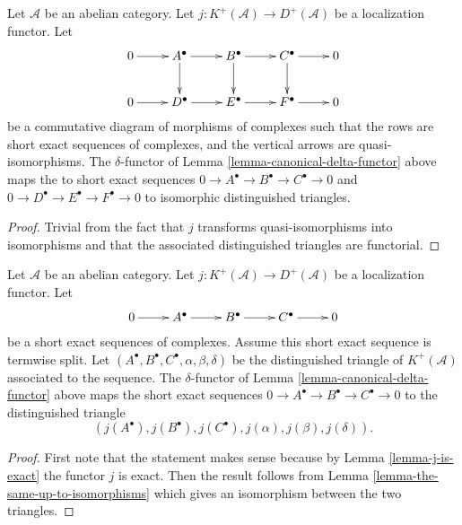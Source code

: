 \begin{lemma}
\label{lemma-compare-triangles-ses}
Let $\mathcal{A}$ be an abelian category.
Let $j : K^{+}(\mathcal{A}) \to D^{+}(\mathcal{A})$ be
a localization functor.
Let
$$
\xymatrix{
0 \ar[r] &
A^\bullet \ar[r] \ar[d] &
B^\bullet \ar[r] \ar[d] &
C^\bullet \ar[r] \ar[d] &
0 \\
0 \ar[r] &
D^\bullet \ar[r] &
E^\bullet \ar[r] &
F^\bullet \ar[r] &
0
}
$$
be a commutative diagram of morphisms of complexes
such that the rows are short exact sequences of complexes, and
the vertical arrows are quasi-isomorphisms.
The $\delta$-functor of Lemma \ref{lemma-canonical-delta-functor} above
maps the to short exact sequences
$0 \to A^\bullet \to B^\bullet \to C^\bullet \to 0$
and
$0 \to D^\bullet \to E^\bullet \to F^\bullet \to 0$
to isomorphic distinguished triangles.
\end{lemma}

\begin{proof}
Trivial from the fact that $j$ transforms quasi-isomorphisms
into isomorphisms and that the associated distinguished
triangles are functorial.
\end{proof}

\begin{lemma}
\label{lemma-compare-trianigles-split-case}
Let $\mathcal{A}$ be an abelian category.
Let $j : K^{+}(\mathcal{A}) \to D^{+}(\mathcal{A})$ be
a localization functor.
Let
$$
\xymatrix{
0 \ar[r] &
A^\bullet \ar[r] &
B^\bullet \ar[r] &
C^\bullet \ar[r] &
0
}
$$
be a short exact sequences of complexes. Assume this short exact sequence
is termwise split. Let
$(A^\bullet, B^\bullet, C^\bullet, \alpha, \beta, \delta)$
be the distinguished triangle of $K^{+}(\mathcal{A})$
associated to the sequence. The $\delta$-functor of
Lemma \ref{lemma-canonical-delta-functor} above
maps the short exact sequences
$0 \to A^\bullet \to B^\bullet \to C^\bullet \to 0$
to the distinguished triangle
$$
(j(A^\bullet), j(B^\bullet), j(C^\bullet), j(\alpha), j(\beta), j(\delta)).
$$
\end{lemma}

\begin{proof}
First note that the statement makes sense because by
Lemma \ref{lemma-j-is-exact} the functor $j$ is exact.
Then the result follows from
Lemma \ref{lemma-the-same-up-to-isomorphisms}
which gives an isomorphism between the two triangles.
\end{proof}

